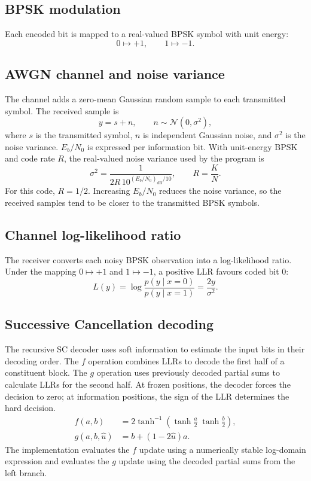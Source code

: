 \documentclass[12pt,a4paper]{article}
\begin{document}
\subsection{BPSK modulation}
Each encoded bit is mapped to a real-valued BPSK symbol with unit energy:
\begin{equation}
  0\mapsto +1, \qquad 1\mapsto -1.
  \label{eq:bpsk}
\end{equation}

\subsection{AWGN channel and noise variance}
The channel adds a zero-mean Gaussian random sample to each transmitted symbol. The received sample is
\begin{equation}
  y=s+n, \qquad n\sim\mathcal{N}(0,\sigma^2),
  \label{eq:awgn}
\end{equation}
where $s$ is the transmitted symbol, $n$ is independent Gaussian noise, and $\sigma^2$ is the noise variance. $E_b/N_0$ is expressed per information bit. With unit-energy BPSK and code rate $R$, the real-valued noise variance used by the program is
\begin{equation}
  \sigma^2=\frac{1}{2R\,10^{(E_b/N_0)_{\mathrm{dB}}/10}},
  \qquad R=\frac{K}{N}.
  \label{eq:noisevariance}
\end{equation}
For this code, $R=1/2$. Increasing $E_b/N_0$ reduces the noise variance, so the received samples tend to be closer to the transmitted BPSK symbols.

\subsection{Channel log-likelihood ratio}
The receiver converts each noisy BPSK observation into a log-likelihood ratio. Under the mapping $0\mapsto +1$ and $1\mapsto -1$, a positive LLR favours coded bit 0:
\begin{equation}
  L(y)=\log\frac{p(y\mid x=0)}{p(y\mid x=1)}
      =\frac{2y}{\sigma^2}.
  \label{eq:llr}
\end{equation}

\subsection{Successive Cancellation decoding}
The recursive SC decoder uses soft information to estimate the input bits in their decoding order. The $f$ operation combines LLRs to decode the first half of a constituent block. The $g$ operation uses previously decoded partial sums to calculate LLRs for the second half. At frozen positions, the decoder forces the decision to zero; at information positions, the sign of the LLR determines the hard decision.
\begin{align}
  f(a,b) &= 2\tanh^{-1}\!\left(\tanh\frac{a}{2}\;\tanh\frac{b}{2}\right),
  \label{eq:fupdate}\\
  g(a,b,\hat{u}) &= b+(1-2\hat{u})a.
  \label{eq:gupdate}
\end{align}
The implementation evaluates the $f$ update using a numerically stable log-domain expression and evaluates the $g$ update using the decoded partial sums from the left branch.
\end{document}
